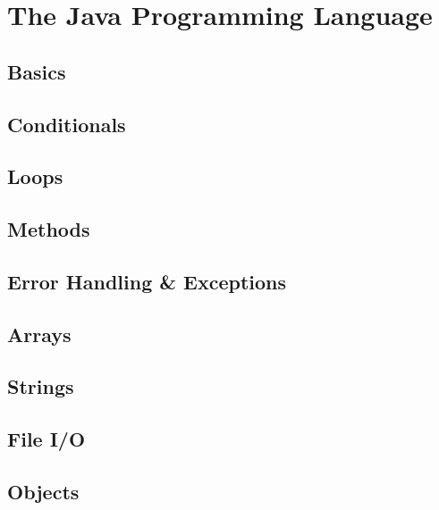 \documentclass[12pt]{scrbook}
\begin{document}
\part{The Java Programming Language}

\chapter{Basics}


\chapter{Conditionals}


\chapter{Loops}


\chapter{Methods}
\label{chapter:java:functions}


\chapter{Error Handling \& Exceptions}
\label{chapter:java:errorHandling}


\chapter{Arrays}
\label{chapter:java:arrays}


\chapter{Strings}
\label{chapter:java:strings}


\chapter{File I/O}
\label{chapter:java:fileIO}


\chapter{Objects}
\label{chapter:java:objects}

\end{document}
